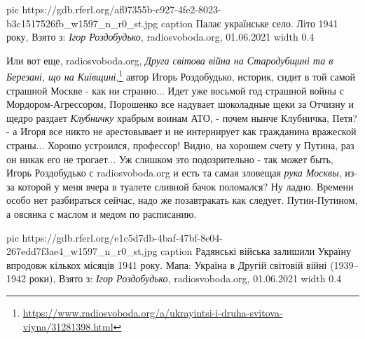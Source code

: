 \ifcmt
  pic https://gdb.rferl.org/af07355b-c927-4fe2-8023-b3c1517526fb_w1597_n_r0_st.jpg
  caption Палає українське село. Літо 1941 року, Взято з: \emph{Ігор Роздобудько}, radiosvoboda.org, 01.06.2021
  width 0.4
\fi

Или вот еще, radiosvoboda.org, \emph{Друга світова війна на Стародубщині та в
Березані, що на
Київщині},\footnote{\url{https://www.radiosvoboda.org/a/ukrayintsi-i-druha-svitova-viyna/31281398.html}}
автор Игорь Роздобудько, историк, сидит в той самой страшной Москве - как ни
странно...  Идет уже восьмой год страшной войны с Мордором-Агрессором,
Порошенко все надувает шоколадные щеки за Отчизну и щедро раздает
\emph{Клубничку} храбрым воинам АТО, - почем нынче Клубничка, Петя? - а Игоря
все никто не арестовывает и не интернирует как гражданина вражеской страны...
Хорошо устроился, профессор! Видно, на хорошем счету у Путина, раз он никак его
не трогает... Уж слишком это подозрительно - так может быть, Игорь Роздобудько
с radiosvoboda.org и есть та самая зловещая \emph{рука Москвы}, из-за которой у
меня вчера в туалете сливной бачок поломался? Ну ладно. Времени особо нет
разбираться сейчас, надо же позавтракать как следует. Путин-Путином, а овсянка
с маслом и медом по расписанию.

\ifcmt
  pic https://gdb.rferl.org/e1c5d7db-4baf-47bf-8e04-267edd7f3ae4_w1597_n_r0_st.jpg
  caption Радянські війська залишили Україну впродовж кількох місяців 1941 року. Мапа: Україна в Другій світовій війні (1939–1942 роки), Взято з: \emph{Ігор Роздобудько}, radiosvoboda.org, 01.06.2021
  width 0.4
\fi

